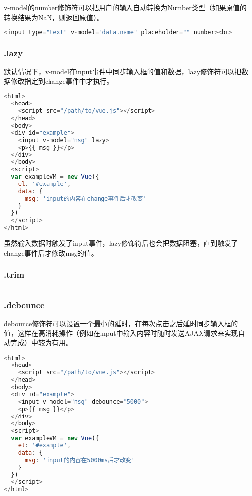 v-model的number修饰符可以把用户的输入自动转换为Number类型（如果原值的转换结果为NaN，则返回原值）。

\begin{lstlisting}[language=JavaScript]
 <input type="text" v-model="data.name" placeholder="" number><br>
\end{lstlisting}


\subsubsection{.lazy}

默认情况下，v-model在input事件中同步输入框的值和数据，lazy修饰符可以把数据修改指定到change事件中才执行。

\begin{lstlisting}[language=JavaScript]
<html>
  <head>
    <script src="/path/to/vue.js"></script>
  </head>
  <body>
  <div id="example">
    <input v-model="msg" lazy>
    <p>{{ msg }}</p>
  </div>
  </body>
  <script>
  var exampleVM = new Vue({
    el: '#example',
    data: {
      msg: 'input的内容在change事件后才改变'
    }
  })
  </script>
</html>
\end{lstlisting}

虽然输入数据时触发了input事件，lazy修饰符后也会把数据阻塞，直到触发了change事件后才修改msg的值。

\subsubsection{.trim}


\begin{lstlisting}[language=JavaScript]

\end{lstlisting}


\subsubsection{.debounce}

debounce修饰符可以设置一个最小的延时，在每次点击之后延时同步输入框的值，这样在高消耗操作（例如在input中输入内容时随时发送AJAX请求来实现自动完成）中较为有用。



\begin{lstlisting}[language=JavaScript]
<html>
  <head>
    <script src="/path/to/vue.js"></script>
  </head>
  <body>
  <div id="example">
    <input v-model="msg" debounce="5000">
    <p>{{ msg }}</p>
  </div>
  </body>
  <script>
  var exampleVM = new Vue({
    el: '#example',
    data: {
      msg: 'input的内容在5000ms后才改变'
    }
  })
  </script>
</html>
\end{lstlisting}





